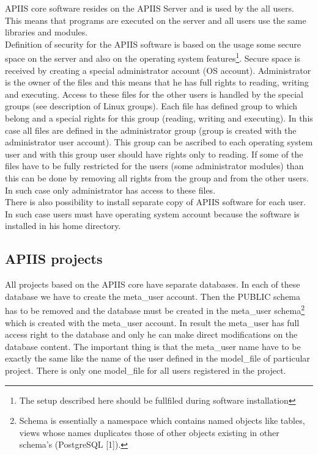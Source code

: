 APIIS core software resides on the APIIS Server and is used by the all users. This means that programs are executed on the server and all users use the same libraries and modules.\\
Definition of security for the APIIS software is based on the usage some secure space on the server and also on the operating system features\footnote{The setup described here should be fullfiled during software installation}. Secure space is received by creating a special administrator account (OS account). Administrator is the owner of the files and this means that he has full rights to reading, writing and executing. Access to these files for the other users is handled by the special groups (see description of Linux groups). Each file has defined group to which belong and a special rights for this group (reading, writing and executing). In this case all files are defined in the administrator group (group is created with the administrator user account). This group can be ascribed to each operating system user and with this group user should have rights only to reading. If some of the files have to be fully restricted for the users (some administrator modules) than this can be done by removing all rights from the group and from the other users. In such case only administrator has access to these files.\\
There is also possibility to install separate copy of APIIS software for each user. In such case users must have operating system account because the software is installed in his home directory.
\bigskip 

\subsection{APIIS projects \label{apiisprojects}}
All projects based on the APIIS core have separate databases. In each of these database we have to create the meta\_user account. Then the PUBLIC schema has to be removed and the database must be created in the meta\_user schema\protect\footnote{Schema is essentially a namespace which contains named objects like tables, views whose names duplicates those of other objects existing in other schema's (PostgreSQL [1]).} which is created with the meta\_user account. In result the meta\_user has full access right to the database and only he can make direct modifications on the database content.
The important thing is that the meta\_user name have to be exactly the same like the name of the user defined in the model\_file of particular project.  There is only one model\_file for all users registered in the project.

